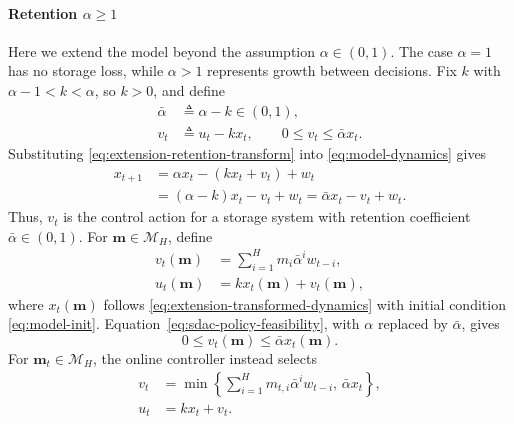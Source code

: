 \documentclass[journal]{IEEEtran}
\theoremstyle{remark}
\begin{document}
\paragraph{Retention $\alpha\ge 1$}
Here we extend the model beyond the assumption $\alpha\in(0,1)$.
The case $\alpha=1$ has no storage loss, while $\alpha>1$ represents growth
between decisions. Fix $k$ with $\alpha-1<k<\alpha$, so $k>0$, and define
\begin{equation}
\label{eq:extension-retention-transform}
\begin{aligned}
\bar\alpha&\triangleq\alpha-k\in(0,1),\\
v_t&\triangleq u_t-kx_t,\qquad 0\le v_t\le\bar\alpha x_t.
\end{aligned}
\end{equation}
Substituting \eqref{eq:extension-retention-transform} into
\eqref{eq:model-dynamics} gives
\begin{equation}
\label{eq:extension-transformed-dynamics}
\begin{aligned}
x_{t+1}&=\alpha x_t-(kx_t+v_t)+w_t\\
&=(\alpha-k)x_t-v_t+w_t
=\bar\alpha x_t-v_t+w_t.
\end{aligned}
\end{equation}
Thus, $v_t$ is the control action for a storage system with retention
coefficient $\bar\alpha\in(0,1)$. For $\mathbf{m}\in\mathcal{M}_H$, define
\begin{equation}
\label{eq:extension-fixed-policy}
\begin{aligned}
v_t(\mathbf{m})&=\sum_{i=1}^H m_i\bar\alpha^i w_{t-i},\\
u_t(\mathbf{m})&=kx_t(\mathbf{m})+v_t(\mathbf{m}),
\end{aligned}
\end{equation}
where $x_t(\mathbf{m})$ follows \eqref{eq:extension-transformed-dynamics}
with initial condition \eqref{eq:model-init}.
Equation~\eqref{eq:sdac-policy-feasibility}, with $\alpha$ replaced by
$\bar\alpha$, gives
\begin{equation}
\label{eq:extension-policy-feasibility}
0\le v_t(\mathbf{m})\le\bar\alpha x_t(\mathbf{m}).
\end{equation}
For $\mathbf{m}_t\in\mathcal{M}_H$, the online controller instead selects
\begin{equation}
\label{eq:extension-online-policy}
\begin{aligned}
v_t&=\min\!\left\{\sum_{i=1}^H m_{t,i}\bar\alpha^i w_{t-i},\,
\bar\alpha x_t\right\},\\
u_t&=kx_t+v_t.
\end{aligned}
\end{equation}
\end{document}
